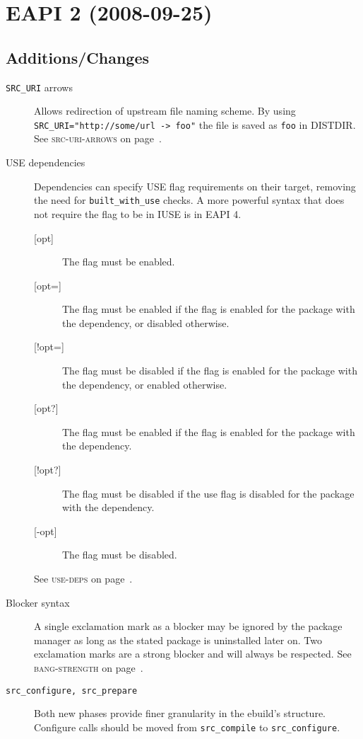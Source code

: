 \documentclass[a4paper]{leaflet}
\newcommand{\code}[1]{\texttt{#1}}
\newcommand{\featureref}[1]{\textsc{#1} on page~\pageref{feat:#1}}
\begin{document}
\section{EAPI 2 (2008-09-25)}
\label{sec:cs:eapi2}
\subsection{Additions/Changes}
\label{sec:cs:eapi2-additions}
\begin{description}
    \item[\code{SRC\_URI} arrows] Allows redirection of upstream file
    naming scheme.  By using \code{SRC\_URI="http://some/url -> foo"}
    the file is saved as \code{foo} in DISTDIR.  See
    \featureref{src-uri-arrows}.
    \item[USE dependencies] Dependencies can specify USE flag
    requirements on their target, removing the need for
    \code{built\_with\_use} checks. A more powerful syntax that does
    not require the flag to be in IUSE is in EAPI 4.
    \begin{description}
        \item[{[opt]}] The flag must be enabled.
        \item[{[opt=]}] The flag must be enabled if the flag is
        enabled for the package with the dependency, or disabled
        otherwise.
        \item[{[!opt=]}] The flag must be disabled if the flag is
        enabled for the package with the dependency, or enabled
        otherwise.
        \item[{[opt?]}] The flag must be enabled if the flag is
        enabled for the package with the dependency.
        \item[{[!opt?]}] The flag must be disabled if the use flag is
        disabled for the package with the dependency.
        \item[{[-opt]}] The flag must be disabled.
    \end{description}
    See \featureref{use-deps}.
    \item[Blocker syntax] A single exclamation mark as a blocker may
    be ignored by the package manager as long as the stated package is
    uninstalled later on.  Two exclamation marks are a strong blocker
    and will always be respected.  See \featureref{bang-strength}.
    \item[\code{src\_configure, src\_prepare}] Both new phases provide
    finer granularity in the ebuild's structure.  Configure calls
    should be moved from \code{src\_compile} to \code{src\_configure}.

\end{description}
\end{document}
